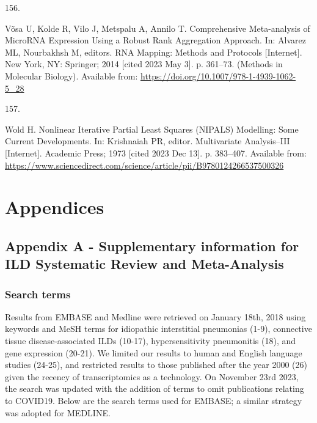 \documentclass[
]{article}
\newlength{\cslhangindent}
\newlength{\csllabelwidth}
\newenvironment{CSLReferences}[2] %
 {\begin{list}{}{%
  \setlength{\itemindent}{0pt}
  \setlength{\leftmargin}{0pt}
  \setlength{\parsep}{0pt}
  \ifodd #1
   \setlength{\leftmargin}{\cslhangindent}
   \setlength{\itemindent}{-1\cslhangindent}
  \fi
  \setlength{\itemsep}{#2\baselineskip}}}
 {\end{list}}
\newcommand{\CSLLeftMargin}[1]{\parbox[t]{\csllabelwidth}{\strut#1\strut}}
\newcommand{\CSLRightInline}[1]{\parbox[t]{\linewidth - \csllabelwidth}{\strut#1\strut}}
\begin{document}
\begin{CSLReferences}{0}{1}
\CSLLeftMargin{156. }%
\CSLRightInline{Võsa U, Kolde R, Vilo J, Metspalu A, Annilo T. Comprehensive {Meta}-analysis of {MicroRNA} {Expression} {Using} a {Robust} {Rank} {Aggregation} {Approach}. In: Alvarez ML, Nourbakhsh M, editors. {RNA} {Mapping}: {Methods} and {Protocols} {[}Internet{]}. New York, NY: Springer; 2014 {[}cited 2023 May 3{]}. p. 361--73. (Methods in {Molecular} {Biology}). Available from: \url{https://doi.org/10.1007/978-1-4939-1062-5_28}}

\CSLLeftMargin{157. }%
\CSLRightInline{Wold H. Nonlinear {Iterative} {Partial} {Least} {Squares} ({NIPALS}) {Modelling}: {Some} {Current} {Developments}. In: Krishnaiah PR, editor. Multivariate {Analysis}--{III} {[}Internet{]}. Academic Press; 1973 {[}cited 2023 Dec 13{]}. p. 383--407. Available from: \url{https://www.sciencedirect.com/science/article/pii/B9780124266537500326}}

\end{CSLReferences}

\clearpage

\setlength{\parindent}{4em} 
\linespread{1}
\doublespacing

\section*{Appendices}

\setcounter{secnumdepth}{0}

\subsection{Appendix A - Supplementary information for ILD Systematic Review and Meta-Analysis}\label{appendix-a---supplementary-information-for-ild-systematic-review-and-meta-analysis}

\renewcommand{\thefigure}{A2.\arabic{figure}}
\setcounter{figure}{0}
\renewcommand{\thetable}{A2.\arabic{table}}
\setcounter{table}{0}
\renewcommand{\theequation}{A2.\arabic{equation}}
\setcounter{equation}{0}

\subsubsection{Search terms}\label{search-terms}

Results from EMBASE and Medline were retrieved on January 18th, 2018 using keywords and MeSH terms for idiopathic interstitial pneumonias (1-9), connective tissue disease-associated ILDs (10-17), hypersensitivity pneumonitis (18), and gene expression (20-21). We limited our results to human and English language studies (24-25), and restricted results to those published after the year 2000 (26) given the recency of transcriptomics as a technology. On November 23rd 2023, the search was updated with the addition of terms to omit publications relating to COVID19. Below are the search terms used for EMBASE; a similar strategy was adopted for MEDLINE.
\end{document}
